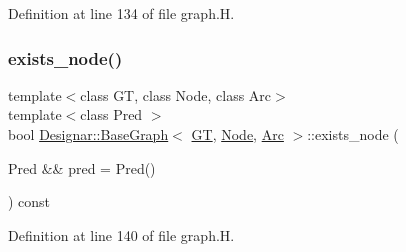 Definition at line 134 of file graph.\+H.

\mbox{\label{class_designar_1_1_base_graph_a62df2c7ec71d2b009e96f8974968a3fc}} 
\subsubsection{\texorpdfstring{exists\+\_\+node()}{exists\_node()}\hspace{0.1cm}{\footnotesize\ttfamily [2/2]}}
{\footnotesize\ttfamily template$<$class GT, class Node, class Arc$>$ \\
template$<$class Pred $>$ \\
bool \hyperlink{class_designar_1_1_base_graph}{Designar\+::\+Base\+Graph}$<$ \hyperlink{demo-buildgraph_8_c_a3001c40d2c31ca87ed96cd7d1334a55e}{GT}, \hyperlink{namespace_designar_a5af326c65aa2bd26b26c410f2030d09e}{Node}, \hyperlink{namespace_designar_a3f55fb5513d62ff47cbc8f72b8e95d6f}{Arc} $>$\+::exists\+\_\+node (\begin{DoxyParamCaption}\item[{Pred \&\&}]{pred = {\ttfamily Pred()} }\end{DoxyParamCaption}) const\hspace{0.3cm}{\ttfamily [inline]}}



Definition at line 140 of file graph.\+H.

\mbox{\label{class_designar_1_1_base_graph_a5e35c97bdf055f67e744f7d961ccb6a9}} 

